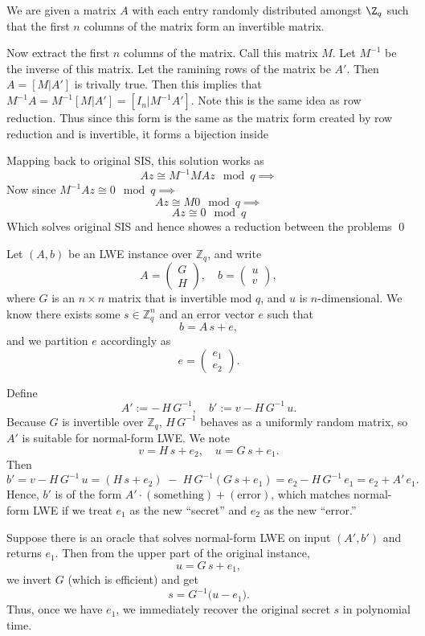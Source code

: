 \documentclass[12pt]{amsart}
\begin{document}
  \begin{problem}
    \begin{subproblem}
      We are given a matrix $A$ with each entry randomly distributed amongst  $\Z_q$ such that the first $n$ columns of the matrix form an invertible matrix.

      Now extract the first $n$ columns of the matrix. Call this matrix $M$. Let $M^{-1}$ be the inverse of this matrix. Let the ramining rows of the matrix be $A'$. Then $A=[M|A']$ is trivally true. Then this implies that $M^{-1}A = M^{-1}[M|A'] = [I_n|M^{-1}A']$. Note this is the same idea as row reduction. Thus since this form is the same as the matrix form created by row reduction and is invertible, it forms a bijection inside 


      Mapping back to original SIS, this solution works as 
      \[Az \cong M^{-1}MAz \mod q \implies\]
      Now since $M^{-1}Az \cong 0 \mod q \implies$
      \[Az \cong M 0 \mod q \implies\]
      \[Az \cong 0 \mod q\]
      Which solves original SIS and hence showes a reduction between the problems \qed
      
    \end{subproblem}
    \begin{subproblem}
      
Let $(A,b)$ be an LWE instance over $\mathbb{Z}_q$, and write
\[
A = 
\begin{pmatrix}
G \\[4pt]
H
\end{pmatrix},
\quad
b =
\begin{pmatrix}
u \\[4pt]
v
\end{pmatrix},
\]
where $G$ is an $n\times n$ matrix that is invertible mod $q$, and $u$ is $n$-dimensional. We know there exists some $s\in \mathbb{Z}_q^n$ and an error vector $e$ such that
\[
b = A\,s + e,
\]
and we partition $e$ accordingly as
\[
e = 
\begin{pmatrix}
e_1 \\
e_2
\end{pmatrix}.
\]

Define
\[
A' := -\,H\,G^{-1},
\quad
b' := v - H\,G^{-1}\,u.
\]
Because $G$ is invertible over $\mathbb{Z}_q$, $H\,G^{-1}$ behaves as a uniformly random matrix, so $A'$ is suitable for normal-form LWE. We note
\[
v = H\,s + e_2,
\quad
u = G\,s + e_1.
\]
Then
\[
b'
= v - H\,G^{-1}\,u
= (H\,s + e_2)\;-\; H\,G^{-1}(G\,s + e_1)
= e_2 - H\,G^{-1}\,e_1 
= e_2 + A'\,e_1.
\]
Hence, $b'$ is of the form $A'\cdot(\text{something}) + (\text{error})$, which matches normal-form LWE if we treat $e_1$ as the new ``secret'' and $e_2$ as the new ``error.''  

Suppose there is an oracle that solves normal-form LWE on input $(A',b')$ and returns $e_1.$ Then from the upper part of the original instance,
\[
u = G\,s + e_1,
\]
we invert $G$ (which is efficient) and get
\[
s = G^{-1}\bigl(u - e_1\bigr).
\]
Thus, once we have $e_1$, we immediately recover the original secret $s$ in polynomial time.
    \end{subproblem}
  \end{problem}
\end{document}
